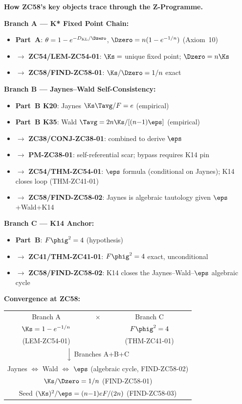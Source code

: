 \documentclass[12pt, a4paper]{article}
\begin{document}
\begin{genealogybox}
\textbf{How ZC58's key objects trace through the Z-Programme.}

\medskip
\textbf{Branch A --- K* Fixed Point Chain:}
\begin{itemize}[leftmargin=2em, noitemsep]
\item \textbf{Part~A}: $\theta = 1-e^{-D_{\rm KL}/\Dzero}$,
  $\Dzero=n(1-e^{-1/n})$ (Axiom~10)
\item $\to$ \textbf{ZC54/LEM-ZC54-01}: $\Ks=$ unique fixed point;
  $\Dzero=n\Ks$
\item $\to$ \textbf{ZC58/FIND-ZC58-01}: $\Ks/\Dzero=1/n$ exact
\end{itemize}

\medskip
\textbf{Branch B --- Jaynes--Wald Self-Consistency:}
\begin{itemize}[leftmargin=2em, noitemsep]
\item \textbf{Part~B K20}: Jaynes $\Ks\Tavg/F=e$ (empirical)
\item \textbf{Part~B K35}: Wald $\Tavg=2n\Ks/[(n{-}1)\eps]$ (empirical)
\item $\to$ \textbf{ZC38/CONJ-ZC38-01}: combined to derive $\eps$
\item $\to$ \textbf{PM-ZC38-01}: self-referential scar;
  bypass requires K14 pin
\item $\to$ \textbf{ZC54/THM-ZC54-01}: $\eps$ formula (conditional
  on Jaynes); K14 closes loop (THM-ZC41-01)
\item $\to$ \textbf{ZC58/FIND-ZC58-02}: Jaynes is algebraic
  tautology given $\eps$+Wald+K14
\end{itemize}

\medskip
\textbf{Branch C --- K14 Anchor:}
\begin{itemize}[leftmargin=2em, noitemsep]
\item \textbf{Part~B}: $F\phig^2=4$ (hypothesis)
\item $\to$ \textbf{ZC41/THM-ZC41-01}: $F\phig^2=4$ exact,
  unconditional
\item $\to$ \textbf{ZC58/FIND-ZC58-02}: K14 closes the
  Jaynes--Wald--$\eps$ algebraic cycle
\end{itemize}

\medskip
\textbf{Convergence at ZC58:}
\begin{center}
\begin{tabular}{@{}ccc@{}}
Branch A & $\times$ & Branch C \\
$\Ks=1-e^{-1/n}$ & & $F\phig^2=4$ \\
(LEM-ZC54-01) & & (THM-ZC41-01) \\
\multicolumn{3}{c}{$\Big\downarrow$ Branches A+B+C} \\
\multicolumn{3}{c}{Jaynes $\Leftrightarrow$ Wald $\Leftrightarrow$ $\eps$
  (algebraic cycle, FIND-ZC58-02)} \\
\multicolumn{3}{c}{$\Ks/\Dzero=1/n$ (FIND-ZC58-01)} \\
\multicolumn{3}{c}{Seed $(\Ks)^2/\eps=(n{-}1)eF/(2n)$ (FIND-ZC58-03)} \\
\end{tabular}
\end{center}


\end{genealogybox}
\end{document}
